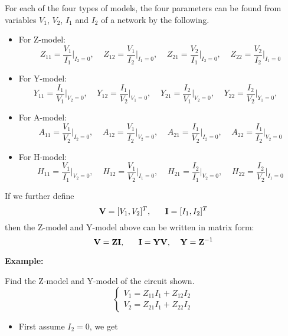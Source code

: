 \begin{itemize}
For each of the four types of models, the four parameters can be found
from variables $V_1$, $V_2$, $I_1$ and $I_2$ of a network by the following.
\begin{itemize}
\item For Z-model:
  \[
  Z_{11}=\frac{V_1}{I_1}\bigg|_{I_2=0},\;\;\;\;
  Z_{12}=\frac{V_1}{I_2}\bigg|_{I_1=0},\;\;\;\;
  Z_{21}=\frac{V_2}{I_1}\bigg|_{I_2=0},\;\;\;\;
  Z_{22}=\frac{V_2}{I_2}\bigg|_{I_1=0}
  \]
\item For Y-model:
  \[
  Y_{11}=\frac{I_1}{V_1}\bigg|_{V_2=0},\;\;\;\;
  Y_{12}=\frac{I_1}{V_2}\bigg|_{V_1=0},\;\;\;\;
  Y_{21}=\frac{I_2}{V_1}\bigg|_{V_2=0},\;\;\;\;
  Y_{22}=\frac{I_2}{V_2}\bigg|_{Y_1=0},\;\;\;\;
  \]
\item For A-model:
  \[
  A_{11}=\frac{V_1}{V_2}\bigg|_{I_2=0},\;\;\;\;
  A_{12}=\frac{V_1}{I_2}\bigg|_{V_2=0},\;\;\;\;
  A_{21}=\frac{I_1}{V_2}\bigg|_{I_2=0},\;\;\;\;
  A_{22}=\frac{I_1}{I_2}\bigg|_{V_2=0}
  \]
\item For H-model:
  \[
  H_{11}=\frac{V_1}{I_1}\bigg|_{V_2=0},\;\;\;\;
  H_{12}=\frac{V_1}{V_2}\bigg|_{I_1=0},\;\;\;\;
  H_{21}=\frac{I_2}{I_1}\bigg|_{V_2=0},\;\;\;\;
  H_{22}=\frac{I_2}{V_2}\bigg|_{I_1=0}
  \]
\end{itemize}

If we further define
\[
  {\bf V}=[V_1, V_2]^T,\;\;\;\;\;\;{\bf I}=[I_1, I_2]^T	
\]
then the Z-model and Y-model above can be written in matrix form:
\[
  {\bf V}={\bf Z} {\bf I},\;\;\;\;\;\;
  {\bf I}={\bf Y} {\bf V},\;\;\;\;{\bf Y}={\bf Z}^{-1}		
\]

{\bf Example: } 


Find the Z-model and Y-model of the circuit shown.
\[
\left\{ \begin{array}{l} V_1=Z_{11}I_1+Z_{12}I_2 \\
  V_2=Z_{21}I_1+Z_{22}I_2 \end{array} \right.
\]
\begin{itemize}
\item First assume $I_2=0$, we get


\end{itemize}
\end{itemize}
